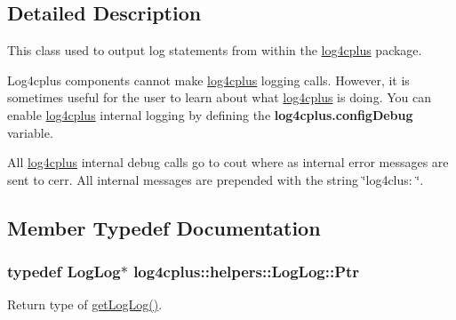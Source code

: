 \subsection{Detailed Description}
This class used to output log statements from within the \hyperlink{namespacelog4cplus}{log4cplus} package.

Log4cplus components cannot make \hyperlink{namespacelog4cplus}{log4cplus} logging calls. However, it is sometimes useful for the user to learn about what \hyperlink{namespacelog4cplus}{log4cplus} is doing. You can enable \hyperlink{namespacelog4cplus}{log4cplus} internal logging by defining the {\bfseries log4cplus.\-config\-Debug} variable.

All \hyperlink{namespacelog4cplus}{log4cplus} internal debug calls go to {\ttfamily cout} where as internal error messages are sent to {\ttfamily cerr}. All internal messages are prepended with the string \char`\"{}log4clus\-: \char`\"{}. 

\subsection{Member Typedef Documentation}
\hypertarget{classlog4cplus_1_1helpers_1_1LogLog_ac7b386006c89f28eed8c03a86311d75a}{
\subsubsection[{Ptr}]{\setlength{\rightskip}{0pt plus 5cm}typedef {\bf Log\-Log}$\ast$ {\bf log4cplus\-::helpers\-::\-Log\-Log\-::\-Ptr}}}\label{classlog4cplus_1_1helpers_1_1LogLog_ac7b386006c89f28eed8c03a86311d75a}


Return type of \hyperlink{classlog4cplus_1_1helpers_1_1LogLog_a1c24d00722bb900ca23f24a0481d03ab}{get\-Log\-Log()}. 



